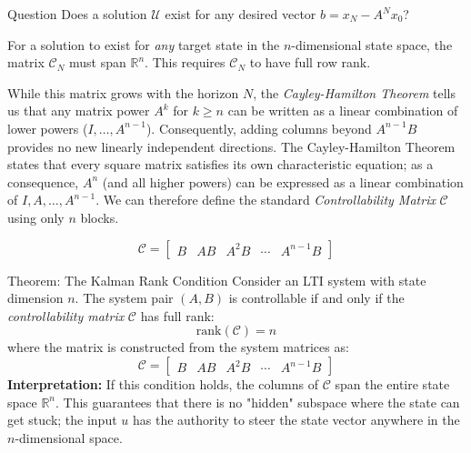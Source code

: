 \begin{alertbox}{Question}
Does a solution $\mathcal{U}$ exist for any desired vector ${b} = x_N - A^N x_0$?
\end{alertbox}
For a solution to exist for \emph{any} target state in the $n$-dimensional state space, the matrix $\mathcal{C}_N$ must span $\mathbb{R}^n$. This requires $\mathcal{C}_N$ to have full row rank. 

While this matrix grows with the horizon $N$, the \emph{Cayley-Hamilton Theorem} tells us that any matrix power $A^k$ for $k \ge n$ can be written as a linear combination of lower powers ($I, \dots, A^{n-1}$). Consequently, adding columns beyond $A^{n-1}B$ provides no new linearly independent directions.
The Cayley-Hamilton Theorem states that every square matrix satisfies its own characteristic equation; as a consequence, $A^n$ (and all higher powers) can be expressed as a linear combination of $I, A, \dots, A^{n-1}$.
We can therefore define the standard \emph{Controllability Matrix} $\mathcal{C}$ using only $n$ blocks.

\begin{equation*}
	\mathcal{C} = \begin{bmatrix} B & AB & A^2 B & \cdots & A^{n-1} B \end{bmatrix}
\end{equation*}

\begin{alertbox}{Theorem: The Kalman Rank Condition}
	Consider an LTI system with state dimension $n$. The system pair $(A, B)$ is controllable if and only if the \emph{controllability matrix} $\mathcal{C}$ has full rank:
	\begin{equation*}
		\text{rank}(\mathcal{C}) = n
	\end{equation*}
	where the matrix is constructed from the system matrices as:
	\begin{equation*}
		\mathcal{C} = \begin{bmatrix} B & AB & A^2B & \cdots & A^{n-1}B \end{bmatrix}
	\end{equation*}
	\textbf{Interpretation:} If this condition holds, the columns of $\mathcal{C}$ span the entire state space $\mathbb{R}^n$. This guarantees that there is no "hidden" subspace where the state can get stuck; the input $u$ has the authority to steer the state vector anywhere in the $n$-dimensional space.
\end{alertbox}


